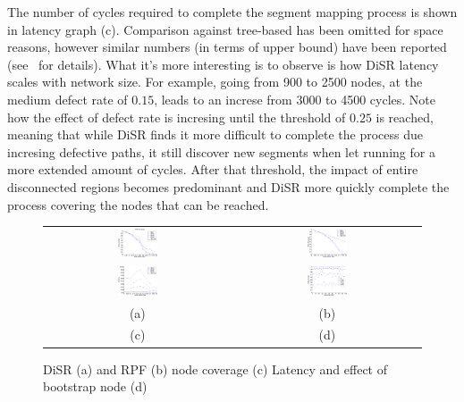 The number of cycles required to complete the segment mapping
process is shown in latency graph (c). Comparison against tree-based
has been omitted for space reasons, however similar numbers (in terms
of upper bound) have been reported
(see~\cite{Patwardhan05evaluatingthe} for details). What it's more
interesting is to observe is how DiSR latency scales with network
size. For example, going from 900 to 2500 nodes, at the medium defect
rate of $0.15$, leads to an increse from 3000 to 4500 cycles. Note how
the effect of defect rate is incresing until the threshold of $0.25$
is reached, meaning that while DiSR finds it more difficult to
complete the process due incresing defective paths, it still discover
new segments when let running for a more extended amount of cycles.
After that threshold, the impact of entire disconnected regions
becomes predominant and DiSR more quickly complete the process
covering the nodes that can be reached. 

\begin{figure}
  \centering
  \begin{tabular}{cc}
    \includegraphics[width=0.22\textwidth]{pictures/set1.eps} & 
    \includegraphics[width=0.22\textwidth]{pictures/coverage.eps} \\
    \includegraphics[width=0.22\textwidth]{pictures/set2.eps} & 
    \includegraphics[width=0.22\textwidth]{pictures/set3.eps} \\
    (a) & (b) \\
    (c) & (d) \\
  \end{tabular}
  \caption{DiSR (a) and RPF (b) node coverage (c) Latency and effect
  of bootstrap node (d)}
  \label{fig:results}
\end{figure}

